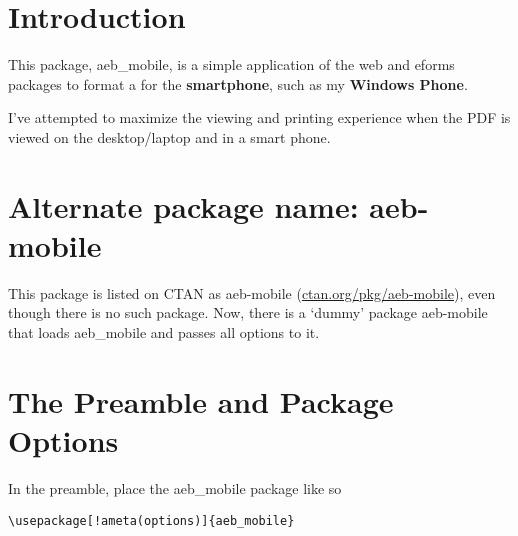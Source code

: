 \documentclass{article}
\let\pkg\textsf
\begin{document}
\maketitle

\tableofcontents
{}

\section{Introduction}

This package, \pkg{aeb\_mobile}, is a simple application
of the \pkg{web} and \pkg{eforms} packages to format a {\PDF} for the
\textbf{smartphone}, such as my \textbf{Windows Phone}.

I've attempted to maximize the viewing and printing experience when the
PDF is viewed on the desktop/laptop and in a smart phone.

\section{Alternate package name: \texorpdfstring{\protect\pkg{aeb-mobile}}{aeb-mobile}}

This package is listed on CTAN as \pkg{aeb-mobile} (\href{https://www.ctan.org/pkg/aeb-mobile}{ctan.org/pkg/aeb-mobile}), even though there is no such package. Now, there
is a `dummy' package \pkg{aeb-mobile} that loads \pkg{aeb\_mobile} and passes all options to it.

\section{The Preamble and Package Options}

In the preamble, place the \textsf{aeb\_mobile} package like so
\begin{Verbatim}[xleftmargin=20pt,commandchars=!()]
\usepackage[!ameta(options)]{aeb_mobile}
\end{Verbatim}
\end{document}
